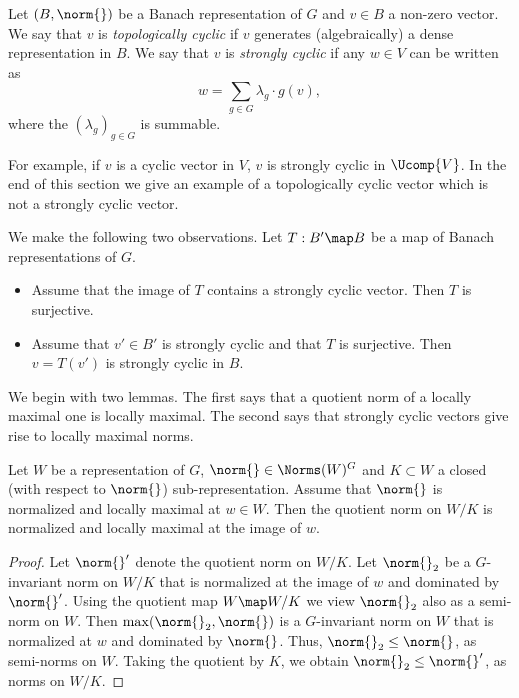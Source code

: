 \begin{defn}\label{def_srongly_cyclic_vector}
Let $(B,\norm{})$ be a Banach representation of $G$ and $v\in B$ a non-zero vector.
We say that $v$ is \textit{topologically cyclic} if $v$ generates (algebraically) a dense representation in $B$.
We say that $v$ is \textit{strongly cyclic} if any $w\in V$ can be written as
\[w=\sum_{g\in G}\lambda_g\cdot g(v),\]
where the $(\lambda_g)_{g\in G}$ is summable.
\end{defn} 
For example, if $v$ is a cyclic vector in $V$, $v$ is strongly cyclic in $\Ucomp{V}$.
In the end of this section we give an example of a topologically cyclic vector which is not a strongly cyclic vector.

We make the following two observations.
Let $T:B'\map B$ be a map of Banach representations of $G$.
    \begin{itemize}
    \item Assume that the image of $T$ contains a strongly cyclic vector. 
    Then $T$ is surjective.
    \item Assume that $v'\in B'$ is strongly cyclic and that $T$ is surjective.
    Then $v=T(v')$ is strongly cyclic in $B$.
    \end{itemize}

We begin with two lemmas.
The first says that a quotient norm of a locally maximal one is locally maximal.
The second says that strongly cyclic vectors give rise to locally maximal norms.

\begin{lem}\label{lem_quotient_locally_maximal_norms}
Let $W$ be a representation of $G$, $\norm{}\in \Norms(W)^G$ and $K\subset W$ a closed (with respect to $\norm{}$) sub-representation.
Assume that $\norm{}$ is normalized and locally maximal at $w\in W$.
Then the quotient norm on $W/K$ is normalized and locally maximal at the image of $w$.
\end{lem} 
    \begin{proof}
    Let $\norm{}'$ denote the quotient norm on $W/K$.
    Let $\norm{}_2$ be a $G$-invariant norm on $W/K$ that is normalized at the image of $w$ and dominated by $\norm{}'$.
    Using the quotient map $W\map W/K$ we view $\norm{}_2$ also as a semi-norm on $W$.
    Then $\max(\norm{}_2,\norm{})$ is a $G$-invariant norm on $W$ that is normalized at $w$ and dominated by $\norm{}$.
    Thus, $\norm{}_2\leq \norm{}$, as semi-norms on $W$.
    Taking the quotient by $K$, we obtain $\norm{}_2\leq \norm{}'$, as norms on $W/K$.    
    \end{proof} 


